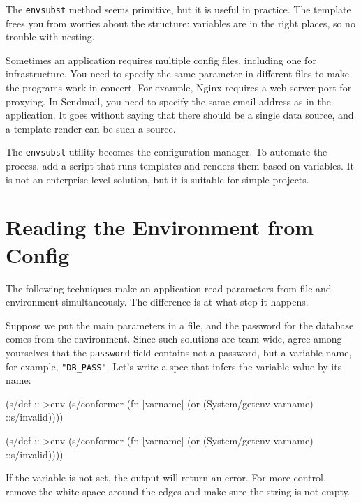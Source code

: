 \fi

The \verb|envsubst| method seems primitive, but it is useful in practice. The template frees you from worries about the structure: variables are in the right places, so no trouble with nesting.

Sometimes an application requires multiple config files, including one for infrastructure. You need to specify the same parameter in different files to make the programs work in concert. For example, Nginx requires a web server port for proxying. In Sendmail, you need to specify the same email address as in the application. It goes without saying that there should be a single data source, and a template render can be such a source.

The \verb|envsubst| utility becomes the configuration manager. To automate the process, add a script that runs templates and renders them based on variables. It is not an enterprise-level solution, but it is suitable for simple projects.

\section{ Reading the Environment from Config}

The following techniques make an application read parameters from file and environment simultaneously. The difference is at what step it happens.

Suppose we put the main parameters in a file, and the password for the database comes from the environment. Since such solutions are team-wide, agree among yourselves that the \verb|password| field contains not a password, but a variable name, for example, \verb|"DB_PASS"|. Let's write a spec that infers the variable value by its name:

\ifnarrow

\begin{clojure}
(s/def ::->env
  (s/conformer
   (fn [varname]
     (or (System/getenv varname)
         ::s/invalid))))
\end{clojure}

\else

\begin{clojure}
(s/def ::->env
  (s/conformer
   (fn [varname]
     (or (System/getenv varname) ::s/invalid))))
\end{clojure}

\fi

If the variable is not set, the output will return an error. For more control, remove the white space around the edges and make sure the string is not empty.

